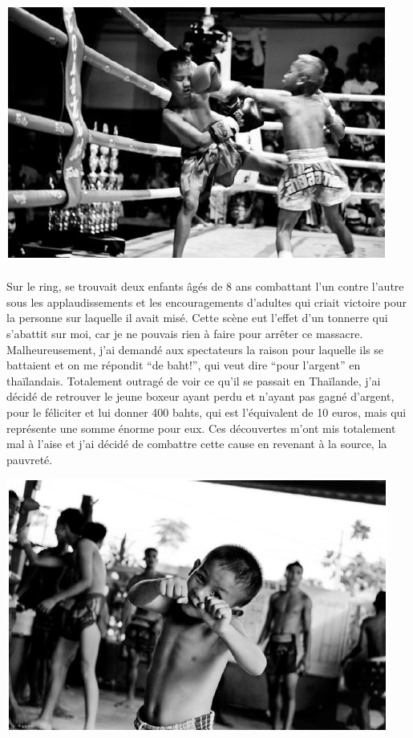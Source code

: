 \begin{center}
	\includegraphics[scale=0.7]{Thai2.jpg}
\end{center}

\paragraph{} Sur le ring, se trouvait deux enfants âgés de 8 ans combattant
l'un contre l'autre sous les applaudissements et les encouragements d'adultes
qui criait victoire pour la personne sur laquelle il avait misé. Cette scène
eut l'effet d'un tonnerre qui s'abattit sur moi, car je ne pouvais rien à faire
pour arrêter ce massacre.  Malheureusement, j'ai demandé aux spectateurs la
raison pour laquelle ils se battaient et on me répondit ``de baht!'', qui veut
dire ``pour l'argent'' en thaïlandais. Totalement outragé de voir ce qu'il se
passait en Thaïlande, j'ai décidé de retrouver le jeune boxeur ayant perdu et
n'ayant pas gagné d'argent, pour le féliciter et lui donner 400 bahts, qui est
l'équivalent de 10 euros, mais qui représente une somme énorme pour eux.  Ces
découvertes m'ont mis totalement mal à l'aise et j'ai décidé de combattre cette
cause en revenant à la source, la pauvreté.

\begin{center}
	\includegraphics[scale=0.7]{Thai3.jpg}
\end{center}

